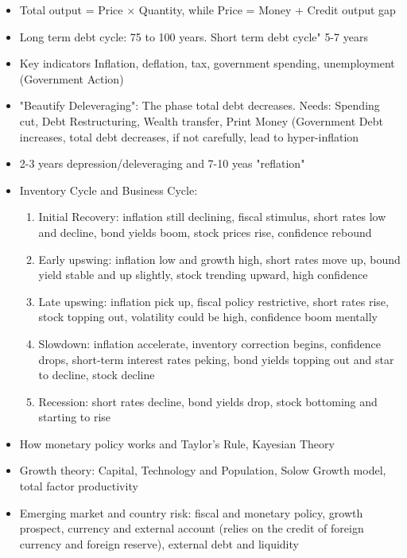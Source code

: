 \documentclass[11pt, openany]{book}              %
\begin{document}
\begin{itemize}
	\item Total output = Price $\times$ Quantity, while Price = Money + Credit
		\subitem output gap
	\item Long term debt cycle: 75 to 100 years. Short term debt cycle" 5-7 years
	\item Key indicators Inflation, deflation, tax, government spending, unemployment (Government Action)
	\item "Beautify Deleveraging": The phase total debt decreases. Needs: Spending cut, Debt Restructuring, Wealth transfer, Print Money (Government Debt increases, total debt decreases, if not carefully, lead to hyper-inflation
	\item 2-3 years depression/deleveraging and 7-10 yeas "reflation"
	\item Inventory Cycle and Business Cycle:
	\subitem \begin{enumerate}
		\item Initial Recovery: inflation still declining, fiscal stimulus, short rates low and decline, bond yields boom, stock prices rise, confidence rebound
		\item Early upswing: inflation low and growth high, short rates move up, bound yield stable and up slightly, stock trending upward, high confidence
		\item Late upswing: inflation pick up, fiscal policy restrictive, short rates rise, stock topping out, volatility could be high, confidence boom mentally
		\item Slowdown: inflation accelerate, inventory correction begins, confidence drops, short-term interest rates peking, bond yields topping out and star to decline, stock decline
		\item Recession: short rates decline, bond yields drop, stock bottoming and starting to rise
	\end{enumerate}
	\item How monetary policy works and Taylor's Rule, Kayesian Theory 
	\item Growth theory: Capital, Technology and Population, Solow Growth model, total factor productivity 
	\item Emerging market and country risk: fiscal and monetary policy, growth prospect, currency and external account (relies on the credit of foreign currency and foreign reserve), external debt and liquidity
\end{itemize}
\end{document}

